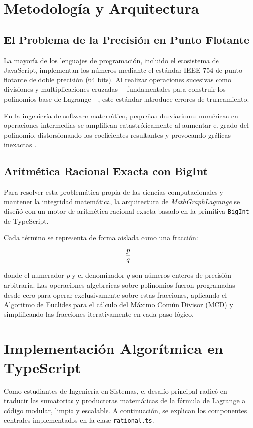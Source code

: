 \documentclass[conference]{IEEEtran}
\begin{document}
\section{Metodología y Arquitectura}

\subsection{El Problema de la Precisión en Punto Flotante}
La mayoría de los lenguajes de programación, incluido el ecosistema de JavaScript, implementan los números mediante el estándar IEEE 754 de punto flotante de doble precisión (64 bits). Al realizar operaciones sucesivas como divisiones y multiplicaciones cruzadas —fundamentales para construir los polinomios base de Lagrange—, este estándar introduce errores de truncamiento. 

\vspace{0.2cm}

En la ingeniería de software matemático, pequeñas desviaciones numéricas en operaciones intermedias se amplifican catastróficamente al aumentar el grado del polinomio, distorsionando los coeficientes resultantes y provocando gráficas inexactas \cite{b2}.

\subsection{Aritmética Racional Exacta con BigInt}
Para resolver esta problemática propia de las ciencias computacionales y mantener la integridad matemática, la arquitectura de \textit{MathGraphLagrange} se diseñó con un motor de aritmética racional exacta basado en la primitiva \texttt{BigInt} de TypeScript.

Cada término se representa de forma aislada como una fracción:

\begin{equation}
\frac{p}{q}
\vspace{0.1cm}
\end{equation}

donde el numerador $p$ y el denominador $q$ son números enteros de precisión arbitraria. Las operaciones algebraicas sobre polinomios fueron programadas desde cero para operar exclusivamente sobre estas fracciones, aplicando el Algoritmo de Euclides para el cálculo del Máximo Común Divisor (MCD) y simplificando las fracciones iterativamente en cada paso lógico.

\section{Implementación Algorítmica en TypeScript}
Como estudiantes de Ingeniería en Sistemas, el desafío principal radicó en traducir las sumatorias y productoras matemáticas de la fórmula de Lagrange a código modular, limpio y escalable. A continuación, se explican los componentes centrales implementados en la clase \texttt{rational.ts}.
\end{document}
